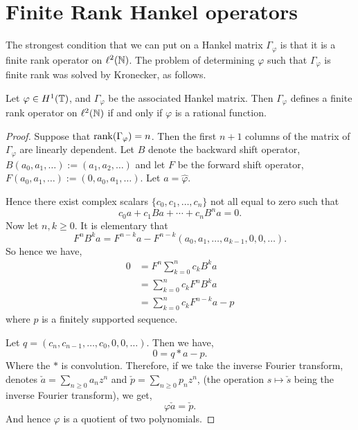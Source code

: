 \section{Finite Rank Hankel operators}
The strongest condition that we can put on a Hankel matrix $\Gamma_\varphi$
is that it is a finite rank operator on $\ell^2(\mathbb{N})$. The problem
of determining $\varphi$ such that $\Gamma_\varphi$ is finite rank
was solved by Kronecker, as follows.
\begin{theorem}[Kronecker]
\label{kronecker}
    Let $\varphi \in H^1(\mathbb{T})$, and $\Gamma_\varphi$ be the associated Hankel
    matrix. Then $\Gamma_\varphi$ defines a finite rank operator on $\ell^2(\mathbb{N})$
    if and only if $\varphi$ is a rational function.
\end{theorem}
\begin{proof}
    Suppose that $\operatorname{rank}(\Gamma_\varphi) = n$. Then the first $n+1$
    columns of the matrix of $\Gamma_\varphi$ are linearly dependent. Let $B$
    denote the backward shift operator, $B(a_0,a_1,\ldots) := (a_1,a_2,\ldots)$
    and let $F$ be the forward shift operator, $F(a_0,a_1,\ldots) := (0,a_0,a_1,\ldots)$.
    Let $a = \hat{\varphi}$.
    
    Hence there exist complex scalars $\{c_0,c_1,\ldots,c_n\}$ not all
    equal to zero such that
    \begin{equation}
        c_0a+c_1Ba+\cdots+c_nB^na = 0.
    \end{equation}
    Now let $n,k \geq 0$. It is elementary that
    \begin{equation}
        F^n B^k a = F^{n-k}a-F^{n-k}(a_0,a_1,\ldots,a_{k-1},0,0,\ldots).
    \end{equation}
    So hence we have,
    \begin{align}
        0 &= F^n\sum_{k=0}^n c_k B^ka \\
          &= \sum_{k=0}^n c_kF^n B^ka\\
          &= \sum_{k=0}^n c_kF^{n-k}a - p
    \end{align}
    where $p$ is a finitely supported sequence. 
    
    Let $q = (c_n,c_{n-1},\ldots,c_0,0,0,\ldots)$. Then we have,
    \begin{equation}
        0 = q * a - p.
    \end{equation}
    Where the $*$ is convolution. Therefore, if we take the inverse Fourier transform,
    denotes $\check{a} = \sum_{n\geq 0} a_n z^n$ and $\check{p} = \sum_{n\geq 0} p_n z^n$,
    (the operation $s \mapsto \check{s}$ being the inverse Fourier transform), we
    get,
    \begin{equation}
        \varphi\check{a} = \check{p}.
    \end{equation}
    And hence $\varphi$ is a quotient of two polynomials.
    

\end{proof}
